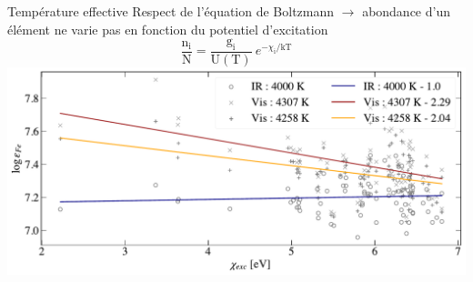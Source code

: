 \documentclass[10pt]{beamer}
\begin{document}
\begin{frame}[fragile]{Température effective}
    Respect de l'équation de Boltzmann $\rightarrow$  abondance d'un élément ne varie pas en fonction du potentiel d'excitation 
    $$\frac{\mathrm{n}_\mathrm{i}}{\mathrm{N}}=\frac{\mathrm{g}_\mathrm{i}}{\mathrm{U(T)}} \ e^{-\chi_\mathrm{i}/\mathrm{kT}}$$
    \vspace{0.5cm}
    \includegraphics[width=\textwidth]{images/comparaison_modèles.pdf}
\end{frame}
\end{document}
